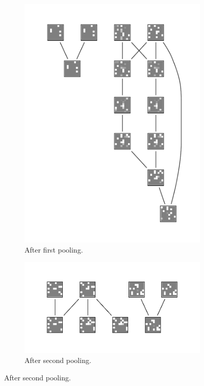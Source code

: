 \documentclass[runningheads]{llncs}
\begin{document}
\begin{figure}
\begin{subfigure}{.3\textwidth}
		\includegraphics[width=\linewidth]{pool0}
		\caption{After first pooling.}
	\end{subfigure}
	\begin{subfigure}{.5\textwidth}
		\centering
		\includegraphics[width=\linewidth]{pool1}
		\caption{After second pooling.}
	\end{subfigure}

\end{figure}
\end{document}
